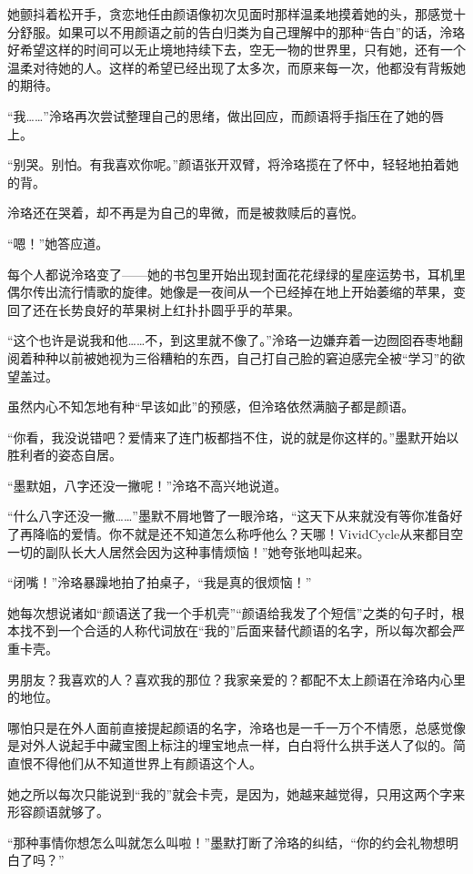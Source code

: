 \documentclass[UTF8, scheme = chinese, openany]{ctexbook}
\begin{document}
她颤抖着松开手，贪恋地任由颜语像初次见面时那样温柔地摸着她的头，那感觉十分舒服。如果可以不用颜语之前的告白归类为自己理解中的那种“告白”的话，泠珞好希望这样的时间可以无止境地持续下去，空无一物的世界里，只有她，还有一个温柔对待她的人。这样的希望已经出现了太多次，而原来每一次，他都没有背叛她的期待。

“我……”泠珞再次尝试整理自己的思绪，做出回应，而颜语将手指压在了她的唇上。

“别哭。别怕。有我喜欢你呢。”颜语张开双臂，将泠珞揽在了怀中，轻轻地拍着她的背。

泠珞还在哭着，却不再是为自己的卑微，而是被救赎后的喜悦。

“嗯！”她答应道。

\vspace{1.5em}

每个人都说泠珞变了——她的书包里开始出现封面花花绿绿的星座运势书，耳机里偶尔传出流行情歌的旋律。她像是一夜间从一个已经掉在地上开始萎缩的苹果，变回了还在长势良好的苹果树上红扑扑圆乎乎的苹果。

“这个也许是说我和他……不，到这里就不像了。”泠珞一边嫌弃着一边囫囵吞枣地翻阅着种种以前被她视为三俗糟粕的东西，自己打自己脸的窘迫感完全被“学习”的欲望盖过。

虽然内心不知怎地有种“早该如此”的预感，但泠珞依然满脑子都是颜语。

“你看，我没说错吧？爱情来了连门板都挡不住，说的就是你这样的。”墨默开始以胜利者的姿态自居。

“墨默姐，八字还没一撇呢！”泠珞不高兴地说道。

“什么八字还没一撇……”墨默不屑地瞥了一眼泠珞，“这天下从来就没有等你准备好了再降临的爱情。你不就是还不知道怎么称呼他么？天哪！VividCycle从来都目空一切的副队长大人居然会因为这种事情烦恼！”她夸张地叫起来。

“闭嘴！”泠珞暴躁地拍了拍桌子，“我是真的很烦恼！”

她每次想说诸如“颜语送了我一个手机壳”“颜语给我发了个短信”之类的句子时，根本找不到一个合适的人称代词放在“我的”后面来替代颜语的名字，所以每次都会严重卡壳。

男朋友？我喜欢的人？喜欢我的那位？我家亲爱的？都配不太上颜语在泠珞内心里的地位。

哪怕只是在外人面前直接提起颜语的名字，泠珞也是一千一万个不情愿，总感觉像是对外人说起手中藏宝图上标注的埋宝地点一样，白白将什么拱手送人了似的。简直恨不得他们从不知道世界上有颜语这个人。

她之所以每次只能说到“我的”就会卡壳，是因为，她越来越觉得，只用这两个字来形容颜语就够了。

“那种事情你想怎么叫就怎么叫啦！”墨默打断了泠珞的纠结，“你的约会礼物想明白了吗？”
\end{document}
